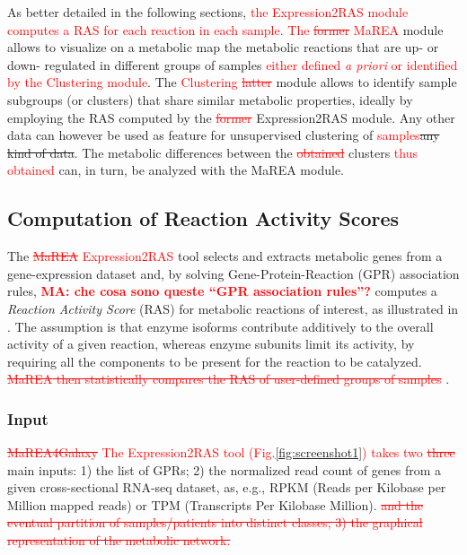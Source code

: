 \documentclass[preprint,12pt,authoryear]{elsarticle}
\newcommand{\red}{\textcolor{red}}
\newcommand{\mareagalaxy}{\textsf{MaREA4Galaxy}}
\newcommand{\mareaTool}{\textsf{MaREA}}
\newcommand{\clusterTool}{\textsf{Clustering}}
\newcommand{\RASTool}{\textsf{Expression2RAS}}
\begin{document}
As better detailed in the following sections, \red{the \RASTool{}
  module computes a RAS for each reaction in each sample. The
  \sout{former} \mareaTool{}} module allows to visualize on a
metabolic map the metabolic reactions that are up- or down- regulated
in different groups of samples \red{either defined \textit{a priori}
  or identified by the \clusterTool{} module}. The \red{\clusterTool{}
  \sout{latter}} module allows to identify sample subgroups (or
clusters) that share similar metabolic properties, ideally by
employing the RAS computed by the \red{\sout{former}} \RASTool{}
module. Any other data can however be used as feature for unsupervised
clustering of \red{samples}\sout{any kind of data}. The metabolic
differences between the \red{\sout{obtained}} clusters \red{thus
  obtained} can, in turn, be analyzed
with the \mareaTool{} module.


\subsection{Computation of Reaction Activity Scores}

The \red{\sout{\mareaTool{}} \RASTool{}} tool selects and extracts
metabolic genes from a gene-expression dataset and, by solving
Gene-Protein-Reaction (GPR) association rules, \red{\bfseries MA: che
  cosa sono queste ``GPR association rules''?} computes a
\emph{Reaction Activity Score} (RAS) for metabolic reactions of
interest, as illustrated in \citep{marea}. The assumption is that
enzyme isoforms contribute additively to the overall activity of a
given reaction, whereas enzyme subunits limit its activity, by
requiring all the components to be present for the reaction to be
catalyzed.
%
\red{\sout{\mareaTool{} then statistically compares the RAS of
    user-defined groups of samples}} \citep{marea}.


\subsubsection{Input}

\red{\sout{\mareagalaxy{}} The \RASTool{} tool
  (Fig.\ref{fig:screenshot1}) takes two \sout{three}} main inputs: 1)
the list of GPRs; 2) the normalized read count of genes from a given
cross-sectional RNA-seq dataset, as, e.g., RPKM (Reads per Kilobase per
Million mapped reads) or TPM (Transcripts Per Kilobase
Million). \red{\sout{and the eventual partition of samples/patients
    into distinct classes; 3) the graphical representation of the
    metabolic network.}}
\end{document}
